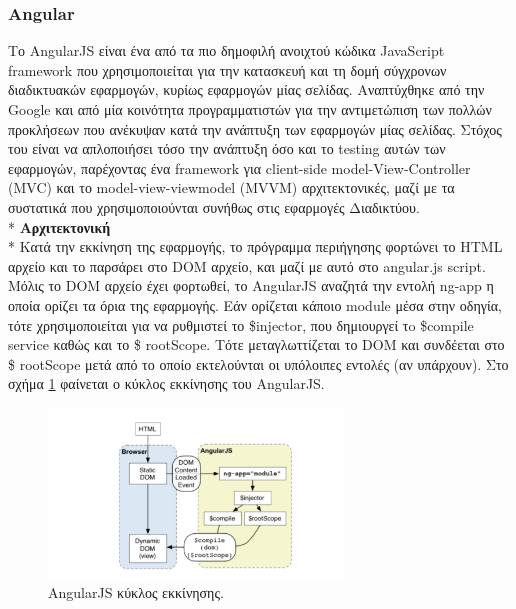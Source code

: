 		\subsubsection{Angular}
		Το AngularJS είναι ένα από τα πιο δημοφιλή ανοιχτού κώδικα JavaScript framework που χρησιμοποιείται για την κατασκευή και τη δομή σύγχρονων διαδικτυακών εφαρμογών, κυρίως εφαρμογών μίας σελίδας. Αναπτύχθηκε από την Google και από μία κοινότητα προγραμματιστών για την αντιμετώπιση των πολλών προκλήσεων που ανέκυψαν κατά την ανάπτυξη των εφαρμογών μίας σελίδας.  Στόχος του είναι να απλοποιήσει τόσο την ανάπτυξη όσο και το testing αυτών των εφαρμογών, παρέχοντας ένα framework για client-side model-View-Controller (MVC) και το model-view-viewmodel (MVVM) αρχιτεκτονικές, μαζί με τα συστατικά που χρησιμοποιούνται συνήθως στις εφαρμογές Διαδικτύου.
	   \\*
			    \textbf{Αρχιτεκτονική}
	 \\*
		Κατά την εκκίνηση της εφαρμογής, το πρόγραμμα περιήγησης φορτώνει το HTML αρχείο και το παρσάρει στο DOM αρχείο, και μαζί με αυτό στο angular.js script. Μόλις το DOM αρχείο έχει φορτωθεί, το AngularJS αναζητά την εντολή ng-app η οποία ορίζει τα όρια της εφαρμογής. Εάν ορίζεται κάποιο module μέσα στην οδηγία, τότε χρησιμοποιείται για να ρυθμιστεί το \$injector, που δημιουργεί τo \$compile service καθώς και το \$ rootScope. Τότε μεταγλωττίζεται το DOM και συνδέεται στο \$ rootScope μετά από το οποίο εκτελούνται οι υπόλοιπες εντολές (αν υπάρχουν). Στο σχήμα \ref{fig:angularjs} φαίνεται ο κύκλος εκκίνησης του AngularJS.
	  \begin{figure}[h]
	    \centering
	    \includegraphics[width=0.7\textwidth]{angularjs.png}
	    \caption{AngularJS κύκλος εκκίνησης.}
	    \label{fig:angularjs}
	\end{figure}

